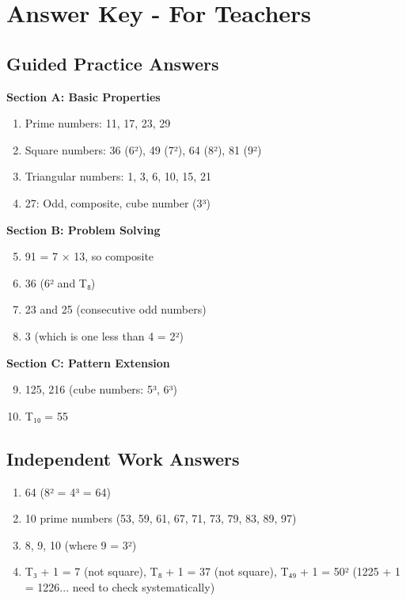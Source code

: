 \documentclass{article}
\begin{document}
\section*{Answer Key - For Teachers}

\subsection*{Guided Practice Answers}

\textbf{Section A: Basic Properties}
\begin{enumerate}
    \item Prime numbers: 11, 17, 23, 29
    \item Square numbers: 36 (6²), 49 (7²), 64 (8²), 81 (9²)
    \item Triangular numbers: 1, 3, 6, 10, 15, 21
    \item 27: Odd, composite, cube number (3³)
\end{enumerate}

\textbf{Section B: Problem Solving}
\begin{enumerate}
    \setcounter{enumi}{4}
    \item 91 = 7 × 13, so composite
    \item 36 (6² and T₈)
    \item 23 and 25 (consecutive odd numbers)
    \item 3 (which is one less than 4 = 2²)
\end{enumerate}

\textbf{Section C: Pattern Extension}
\begin{enumerate}
    \setcounter{enumi}{8}
    \item 125, 216 (cube numbers: 5³, 6³)
    \item T₁₀ = 55
\end{enumerate}

\subsection*{Independent Work Answers}
\begin{enumerate}
    \item 64 (8² = 4³ = 64)
    \item 10 prime numbers (53, 59, 61, 67, 71, 73, 79, 83, 89, 97)
    \item 8, 9, 10 (where 9 = 3²)
    \item T₃ + 1 = 7 (not square), T₈ + 1 = 37 (not square), T₄₉ + 1 = 50² (1225 + 1 = 1226... need to check systematically)
\end{enumerate}
\end{document}
